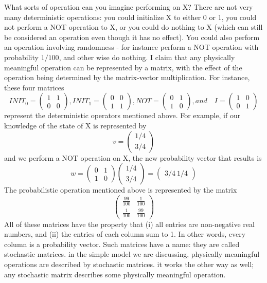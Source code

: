 What sorts of operation can you imagine performing on X? There are not very many deterministic operations: you could initialize X to either 0 or 1, you could not perform a NOT operation to X, or you could do nothing to X (which can still be considered an operation even though it has no effect). You could also perform an operation involving randomness - for instance perform a NOT operation with probability $1/100$, and other wise do nothing. I claim that any physically meaningful operation can be represented by a matrix, with the effect of the operation being determined by the matrix-vector multiplication. For instance, these four matrices
\[
INIT_0 = \begin{pmatrix} 1 & 1 \\ 0 & 0\end{pmatrix}, INIT_1= \begin{pmatrix} 0 & 0 \\ 1 & 1 \end{pmatrix}, 
NOT = \begin{pmatrix} 0 & 1 \\ 1 & 0\end{pmatrix}, and \quad I = \begin{pmatrix} 1 & 0 \\ 0 & 1\end{pmatrix}
\]
represent the deterministic operators mentioned above. For example, if our knowledge of the state of X is represented by
\[
v=\begin{pmatrix}1/4 \\ 3/4 \end{pmatrix}
\]
and we perform a NOT operation on X, the new probability vector that results is
\[
w=\begin{pmatrix} 0 & 1 \\ 1 & 0 \end{pmatrix}\begin{pmatrix} 1/4 \\3/4 \end{pmatrix} =\begin{pmatrix}3/4 \ 1/4 \end{pmatrix}
\]
The probabilistic operation mentioned above is represented by the matrix
\[
\begin{pmatrix} \frac{99}{100} & \frac{1}{100} \\ \frac{1}{100} & \frac{99}{100} \end{pmatrix}
\]
All of these matrices have the property that (i) all entries are non-negative real numbers, and (ii) the entries of each column sum to 1. In other words, every column is a probability vector. Such matrices have a name: they are called stochastic matrices. in the simple model we are discussing, physically meaningful operations are described by stochastic matrices. it works the other way as well; any stochastic matrix describes some physically meaningful operation.

